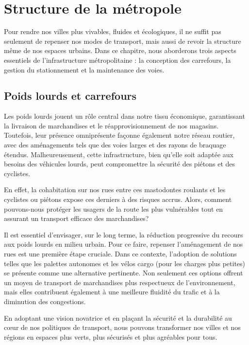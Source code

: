 \chapter{Structure de la métropole}

Pour rendre nos villes plus vivables, fluides et écologiques, il ne
suffit pas seulement de repenser nos modes de transport, mais aussi de
revoir la structure même de nos espaces urbains. Dans ce chapitre,
nous aborderons trois aspects essentiels de l'infrastructure
métropolitaine : la conception des carrefours, la gestion du
stationnement et la maintenance des voies.


\section{Poids lourds et carrefours}

Les poids lourds jouent un rôle central dans notre tissu économique,
garantissant la livraison de marchandises et le réapprovisionnement de
nos magasins. Toutefois, leur présence omniprésente façonne également
notre réseau routier, avec des aménagements tels que des voies larges
et des rayons de braquage étendus. Malheureusement, cette
infrastructure, bien qu'elle soit adaptée aux besoins des véhicules
lourds, peut compromettre la sécurité des piétons et des cyclistes.

En effet, la cohabitation sur nos rues entre ces mastodontes roulants
et les cyclistes ou piétons expose ces derniers à des risques
accrus. Alors, comment pouvons-nous protéger les usagers de la route
les plus vulnérables tout en assurant un transport efficace des
marchandises?

Il est essentiel d'envisager, sur le long terme, la réduction
progressive du recours aux poids lourds en milieu urbain. Pour ce
faire, repenser l'aménagement de nos rues est une première étape
cruciale. Dans ce contexte, l'adoption de solutions telles que les
palettes autonomes et les vélos cargo (pour les charges plus petites)
se présente comme une alternative pertinente. Non seulement ces
options offrent un moyen de transport de marchandises plus respectueux
de l'environnement, mais elles contribuent également à une meilleure
fluidité du trafic et à la diminution des congestions.

En adoptant une vision novatrice et en plaçant la sécurité et la
durabilité au cœur de nos politiques de transport, nous pouvons
transformer nos villes et nos régions en espaces plus verts, plus
sécurisés et plus agréables pour tous.


